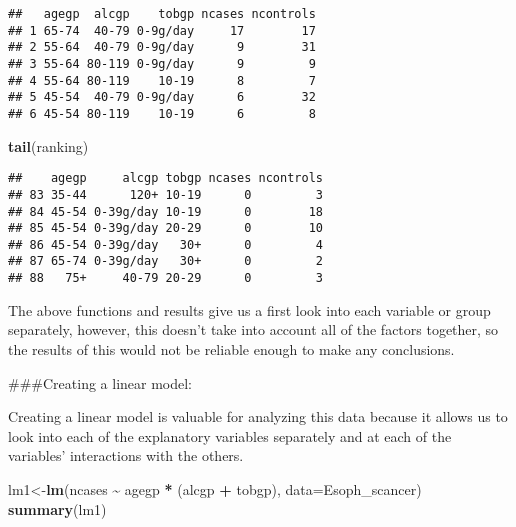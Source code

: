 \documentclass[
]{article}
\newenvironment{Shaded}{\begin{snugshade}}{\end{snugshade}}
\newcommand{\AttributeTok}[1]{\textcolor[rgb]{0.13,0.29,0.53}{#1}}
\newcommand{\FunctionTok}[1]{\textcolor[rgb]{0.13,0.29,0.53}{\textbf{#1}}}
\newcommand{\NormalTok}[1]{#1}
\newcommand{\OtherTok}[1]{\textcolor[rgb]{0.56,0.35,0.01}{#1}}
\newcommand{\SpecialCharTok}[1]{\textcolor[rgb]{0.81,0.36,0.00}{\textbf{#1}}}
\begin{document}
\begin{verbatim}
##   agegp  alcgp    tobgp ncases ncontrols
## 1 65-74  40-79 0-9g/day     17        17
## 2 55-64  40-79 0-9g/day      9        31
## 3 55-64 80-119 0-9g/day      9         9
## 4 55-64 80-119    10-19      8         7
## 5 45-54  40-79 0-9g/day      6        32
## 6 45-54 80-119    10-19      6         8
\end{verbatim}

\begin{Shaded}
\begin{Highlighting}[]
\FunctionTok{tail}\NormalTok{(ranking)}
\end{Highlighting}
\end{Shaded}

\begin{verbatim}
##    agegp     alcgp tobgp ncases ncontrols
## 83 35-44      120+ 10-19      0         3
## 84 45-54 0-39g/day 10-19      0        18
## 85 45-54 0-39g/day 20-29      0        10
## 86 45-54 0-39g/day   30+      0         4
## 87 65-74 0-39g/day   30+      0         2
## 88   75+     40-79 20-29      0         3
\end{verbatim}

The above functions and results give us a first look into each variable
or group separately, however, this doesn't take into account all of the
factors together, so the results of this would not be reliable enough to
make any conclusions.

\#\#\#Creating a linear model:

Creating a linear model is valuable for analyzing this data because it
allows us to look into each of the explanatory variables separately and
at each of the variables' interactions with the others.

\begin{Shaded}
\begin{Highlighting}[]
\NormalTok{lm1}\OtherTok{\textless{}{-}}\FunctionTok{lm}\NormalTok{(ncases }\SpecialCharTok{\textasciitilde{}}\NormalTok{ agegp }\SpecialCharTok{*}\NormalTok{ (alcgp }\SpecialCharTok{+}\NormalTok{ tobgp), }\AttributeTok{data=}\NormalTok{Esoph\_scancer) }
\FunctionTok{summary}\NormalTok{(lm1)}
\end{Highlighting}
\end{Shaded}
\end{document}
